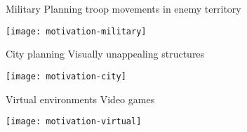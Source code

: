 \begin{frame}{Military}
	Planning troop movements in enemy territory

	\vspace{0.5cm}
	\centering
	\texttt{[image: motivation-military]}
	
\end{frame}

\begin{frame}{City planning}
	Visually unappealing structures

	\vspace{0.5cm}
	\centering
	\texttt{[image: motivation-city]}
	
\end{frame}

\begin{frame}{Virtual environments}
	Video games

	\vspace{0.5cm}
	\centering
	\texttt{[image: motivation-virtual]}
\end{frame}
